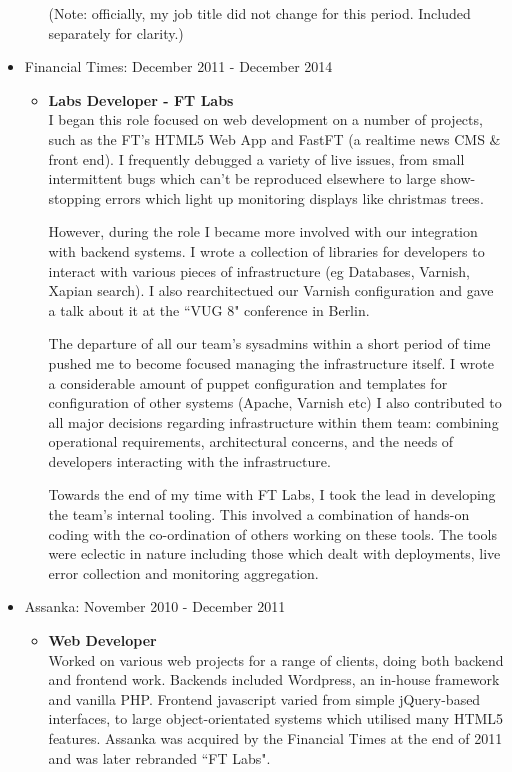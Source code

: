 \documentclass[a4paper]{article}
\begin{document}
\begin{itemize}
\begin{itemize}
(Note: officially, my job title did not change for this period. Included separately for clarity.)
\end{itemize}

\item Financial Times: December 2011 - December 2014
\begin{itemize}
\item {\bf Labs Developer - FT Labs}\\
I began this role focused on web development on a number of projects, such as the FT's HTML5 Web App and FastFT (a realtime news CMS \& front end). I frequently debugged a variety of live issues, from small intermittent bugs which can't be reproduced elsewhere to large show-stopping errors which light up monitoring displays like christmas trees.\par

However, during the role I became more involved with our integration with backend systems. I wrote a collection of libraries for developers to interact with various pieces of infrastructure (eg Databases, Varnish, Xapian search). I also rearchitectued our Varnish configuration and gave a talk about it at the ``VUG 8" conference in Berlin.\par

The departure of all our team's sysadmins within a short period of time pushed me to become focused managing the infrastructure itself.  I wrote a considerable amount of puppet configuration and  templates for configuration of other systems (Apache, Varnish etc) I also contributed to all major decisions regarding infrastructure within them team: combining operational requirements, architectural concerns, and the needs of developers interacting with the infrastructure.\par

Towards the end of my time with FT Labs, I took the lead in developing the team's internal tooling.  This involved a combination of hands-on coding with the co-ordination of others working on these tools.  The tools were eclectic in nature including those which dealt with deployments, live error collection and monitoring aggregation.
\end{itemize}

\item Assanka: November 2010 - December 2011
\begin{itemize}
\item {\bf Web Developer}\\
Worked on various web projects for a range of clients, doing both backend and frontend work. Backends included Wordpress, an in-house framework and vanilla PHP. Frontend javascript varied from simple jQuery-based interfaces, to large object-orientated systems which utilised many HTML5 features.
Assanka was acquired by the Financial Times at the end of 2011 and was later rebranded ``FT Labs".
\end{itemize}

\end{itemize}
\end{document}
